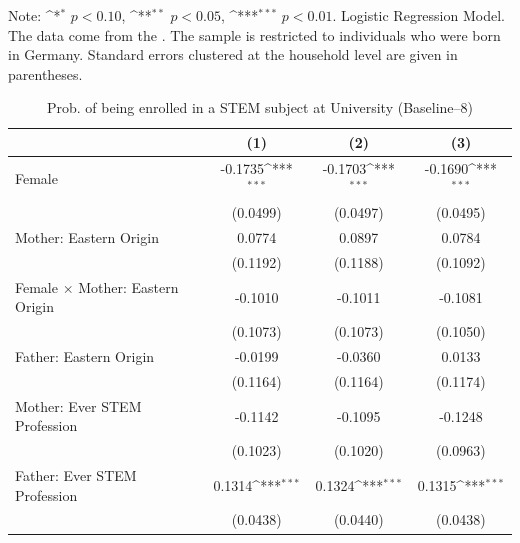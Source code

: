 \documentclass[a4paper, oneside, hyperfootnotes = false]{article}
\def\sym#1{\ifmmode^{#1}\else\(^{#1}\)\fi}
\begin{document}
{\begin{table}[ht]
\begin{center}
		\vspace{2mm}
		
		\parbox{10cm}{
			\linespread{1}\footnotesize Note: \sym{*} \(p<0.10\), \sym{**} \(p<0.05\), \sym{***} \(p<0.01\). Logistic Regression Model. The data come from the \cite{SOEP2023}. The sample is restricted to individuals who were born in Germany. Standard errors clustered at the household level are given in parentheses.}
		
	\end{center}
\end{table}

\begin{table}[ht]
	\caption[STEM subject at University (Baseline--8)]{Prob. of being enrolled in a STEM subject at University (Baseline--8)}
	\label{tab:baseline--8}
	\begin{center}
		\begin{tabular}{l*{3}{c}}
			\toprule
			&\multicolumn{1}{c}{(1)}         &\multicolumn{1}{c}{(2)}         &\multicolumn{1}{c}{(3)}         \\
			\midrule
			Female              &     -0.1735\sym{***}&     -0.1703\sym{***}&     -0.1690\sym{***}\\
			&    (0.0499)         &    (0.0497)         &    (0.0495)         \\
			\addlinespace
			Mother: Eastern Origin&      0.0774         &      0.0897         &      0.0784         \\
			&    (0.1192)         &    (0.1188)         &    (0.1092)         \\
			\addlinespace
			Female $\times$ Mother: Eastern Origin&     -0.1010         &     -0.1011         &     -0.1081         \\
			&    (0.1073)         &    (0.1073)         &    (0.1050)         \\
			\addlinespace
			Father: Eastern Origin&     -0.0199         &     -0.0360         &      0.0133         \\
			&    (0.1164)         &    (0.1164)         &    (0.1174)         \\
			\addlinespace
			Mother: Ever STEM Profession&     -0.1142         &     -0.1095         &     -0.1248         \\
			&    (0.1023)         &    (0.1020)         &    (0.0963)         \\
			\addlinespace
			Father: Ever STEM Profession&      0.1314\sym{***}&      0.1324\sym{***}&      0.1315\sym{***}\\
			&    (0.0438)         &    (0.0440)         &    (0.0438)         \\

\end{tabular}
\end{center}
\end{table}}
\end{document}
